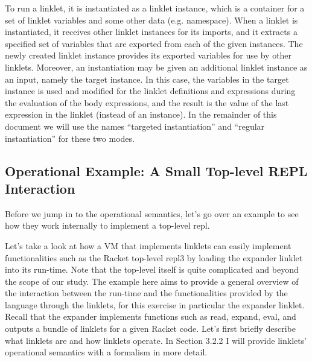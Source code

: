 		To run a linklet, it is instantiated as a linklet instance, which is a container for a set of linklet variables and some other data (e.g. namespace). When a linklet is instantiated, it receives other linklet instances for its imports, and it extracts a specified set of variables that are exported from each of the given instances. The newly created linklet instance provides its exported variables for use by other linklets. Moreover, an instantiation may be given an additional linklet instance as an input, namely the target instance. In this case, the variables in the target instance is used and modified for the linklet definitions and expressions during the evaluation of the body expressions, and the result is the value of the last expression in the linklet (instead of an instance). In the remainder of this document we will use the names “targeted instantiation” and “regular instantiation” for these two modes. 





		\subsection{Operational Example: A Small Top-level REPL Interaction}

		\begin{paragraph-here}
			Before we jump in to the operational semantics, let's go over an example to see how they work internally to implement a top-level repl.

			Let’s take a look at how a VM that implements linklets can easily implement functionalities such as the Racket top-level repl3 by loading the expander linklet into its run-time. Note that the top-level itself is quite complicated and beyond the scope of our study. The example here aims to provide a general overview of the interaction between the run-time and the functionalities provided by the language through the linklets, for this exercise in particular the expander linklet. Recall that the expander implements functions such as read, expand, eval, and outputs a bundle of linklets for a given Racket code. Let’s first briefly describe what linklets are and how linklets operate. In Section 3.2.2 I will provide linklets’ operational semantics with a formalism in more detail.
		\end{paragraph-here}


